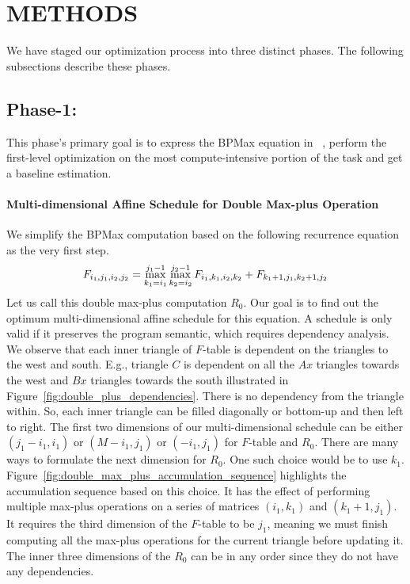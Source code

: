 \section{METHODS} \label{section:methods}
We have staged our optimization process into three distinct phases.  The following subsections describe these phases.

\subsection{Phase-1:}
This phase's primary goal is to express the BPMax equation in \alphaz\ , perform the first-level optimization on the most compute-intensive portion of the task and get a baseline estimation.

\paragraph{Multi-dimensional Affine Schedule for Double Max-plus Operation}
We simplify the BPMax computation based on the following recurrence equation as the very first step.
\begin{equation}
\label{eqn:double_max_plus_recurrence}
F_{i_{1},j_{1},i_{2},j_{2}} \\ = 
                 {\max\limits_{k_{1}=i_{1}}^{j_{1}-1} \max\limits_{k_{2}=i_{2}}^{j_{2}-1} F_{i_{1},k_{1}, i_{2}, k_{2}}+ F_{k_{1}+1,j_{1}, k_{2}+1, j_{2}}}\\
            \\
\end{equation}
Let us call this double max-plus computation $R_{0}$. Our goal is to find out the optimum multi-dimensional affine schedule \cite{feautrier92a, feautrier92b}  for this equation. A schedule is only valid if it preserves the program semantic, which requires dependency analysis. We observe that each inner triangle of $F$-table is dependent on the triangles to the west and south. E.g., triangle $C$ is dependent on all the $Ax$ triangles towards the west and $Bx$ triangles towards the south illustrated in Figure~\ref{fig:double_plus_dependencies}. There is no dependency from the triangle within. So, each inner triangle can be filled diagonally or bottom-up and then left to right. The first two dimensions of our multi-dimensional schedule can be either $(j_{1}-i_{1}, i_{1})$ or $(M-i_{1}, j_{1})$ or $(-i_{1}, j_{1})$ for $F$-table and $R_{0}$. There are many ways to formulate the next dimension for $R_{0}$. One such choice would be to use $k_{1}$. Figure~\ref{fig:double_max_plus_accumulation_sequence} highlights the accumulation sequence based on this choice. It has the effect of performing multiple max-plus operations on a series of matrices $( i_{1}, k_{1})$ and $(k_{1}+1, j_{1})$. It requires the third dimension of the $F$-table to be $j_{1}$, meaning we must finish computing all the max-plus operations for the current triangle before updating it. The inner three dimensions of the $R_{0}$ can be in any order since they do not have any dependencies.
